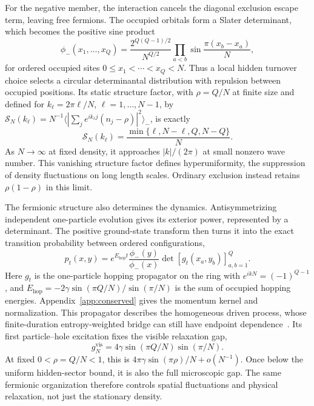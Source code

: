 \documentclass[aps,pre,reprint,amsmath,amssymb,longbibliography,floatfix]{revtex4-2}
\begin{document}
For the negative member, the interaction cancels the diagonal exclusion
escape term, leaving free fermions. The occupied orbitals form a Slater
determinant, which becomes the positive sine product
\begin{equation}
 \phi_-(x_1,\ldots,x_Q)
 =\frac{2^{Q(Q-1)/2}}{N^{Q/2}}
 \prod_{a<b}\sin\frac{\pi(x_b-x_a)}N,
 \label{eq:conserved-vandermonde-main}
\end{equation}
for ordered occupied sites $0\leq x_1<\cdots<x_Q<N$.
Thus a local hidden turnover choice selects a circular determinantal
distribution with repulsion between occupied positions. Its static
structure factor, with $\rho=Q/N$ at finite size and defined for
$k_\ell=2\pi\ell/N$, $\ell=1,\ldots,N-1$, by
$\mathcal S_N(k_\ell)=N^{-1}\langle|\sum_j e^{ik_\ell j}(n_j-\rho)|^2\rangle_-$,
is exactly
\begin{equation}
 \mathcal S_N(k_\ell)=\frac{\min\{\ell,N-\ell,Q,N-Q\}}N.
 \label{eq:conserved-structure-main}
\end{equation}
As $N\to\infty$ at fixed density, it approaches $|k|/(2\pi)$ at small
nonzero wave number. This vanishing structure factor defines
hyperuniformity, the suppression of density fluctuations on long length
scales. Ordinary exclusion instead retains $\rho(1-\rho)$ in this limit.

The fermionic structure also determines the dynamics. Antisymmetrizing
independent one-particle evolution gives its exterior power, represented
by a determinant. The positive ground-state transform then turns it
into the exact transition probability between ordered configurations,
\begin{equation}
 p_t(x,y)=e^{E_{\mathrm{hop}}t}
 \frac{\phi_-(y)}{\phi_-(x)}
 \det\left[g_t(x_a,y_b)\right]_{a,b=1}^Q.
 \label{eq:conserved-temporal-kernel}
\end{equation}
Here $g_t$ is the one-particle hopping propagator on the ring with
$e^{ikN}=(-1)^{Q-1}$, and
$E_{\mathrm{hop}}=-2\gamma\sin(\pi Q/N)/\sin(\pi/N)$ is the sum of
occupied hopping energies. Appendix~\ref{app:conserved} gives the
momentum kernel and normalization. This propagator describes the
homogeneous driven process, whose finite-duration entropy-weighted
bridge can still have endpoint dependence~\cite{PopkovSchutz2011}.
Its first particle--hole excitation fixes the visible relaxation gap,
\begin{equation}
 g_N^{\mathrm{vis}}
 =4\gamma\sin(\pi Q/N)\sin(\pi/N).
 \label{eq:conserved-gap}
\end{equation}
At fixed $0<\rho=Q/N<1$, this is
$4\pi\gamma\sin(\pi\rho)/N+o(N^{-1})$. Once below the uniform
hidden-sector bound, it is also the full microscopic gap. The same
fermionic organization therefore controls spatial fluctuations and
physical relaxation, not just the stationary density.
\end{document}
